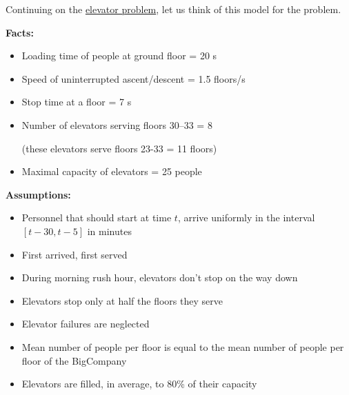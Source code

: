 Continuing on the \hyperref[elevator-model]{elevator problem}, let us think of this model for the problem.

\textbf{Facts:}
\begin{itemize}
	\item Loading time of people at ground floor = 20 s
	\item Speed of uninterrupted ascent/descent = 1.5 floors/s
	\item Stop time at a floor = 7 s
	\item Number of elevators serving floors 30--33 = 8

	(these elevators serve floors 23-33 = 11 floors)
	
	\item Maximal capacity of elevators = 25 people
\end{itemize}


\textbf{Assumptions:}
\begin{itemize}
	\item Personnel that should start at time $t$, arrive uniformly in the interval $[t-30, t-5]$ in minutes
	\item First arrived, first served
	\item During morning rush hour, elevators don't stop on the way down
	\item Elevators stop only at half the floors they serve
	\item Elevator failures are neglected
	\item Mean number of people per floor is equal to the mean number of people per floor of the BigCompany
	\item Elevators are filled, in average, to 80\% of their capacity
\end{itemize}

